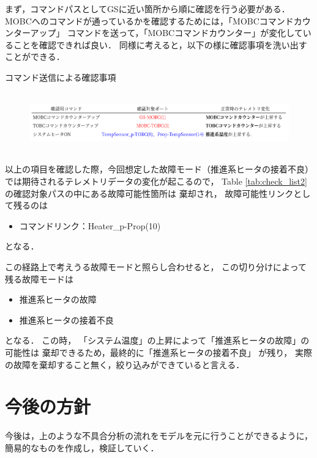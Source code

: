 \documentclass[11pt]{article}
\begin{document}
まず，コマンドパスとしてGSに近い箇所から順に確認を行う必要がある．
MOBCへのコマンドが通っているかを確認するためには，「MOBCコマンドカウンターアップ」
コマンドを送って，「MOBCコマンドカウンター」が変化していることを確認できれば良い．
同様に考えると，以下の様に確認事項を洗い出すことができる．
\begin{table}[H]
   \centering
   \caption{コマンド送信による確認事項} 
   \label{tab:check_list2}
\end{table}
\vspace{-2zh}
\begin{figure}[H]
   \centering
      \includegraphics[height=2.6cm]{figure/check_list.png}
\end{figure}
以上の項目を確認した際，今回想定した故障モード（推進系ヒータの接着不良）
では期待されるテレメトリデータの変化が起こるので，
Table \ref{tab:check_list2}の確認対象パスの中にある故障可能性箇所は
棄却され，
故障可能性リンクとして残るのは
\begin{itemize}
   \item コマンドリンク：Heater\_p-Prop(10)
\end{itemize}
となる．


この経路上で考えうる故障モードと照らし合わせると，
この切り分けによって残る故障モードは
\begin{itemize}
   \item 推進系ヒータの故障
   \item 推進系ヒータの接着不良
\end{itemize}
となる．
この時，
「システム温度」の上昇によって「推進系ヒータの故障」の可能性は
棄却できるため，最終的に「推進系ヒータの接着不良」
が残り，
実際の故障を棄却すること無く，絞り込みができていると言える．\\
\section{今後の方針}
今後は，上のような不具合分析の流れをモデルを元に行うことができるように，
簡易的なものを作成し，検証していく．
\end{document}
